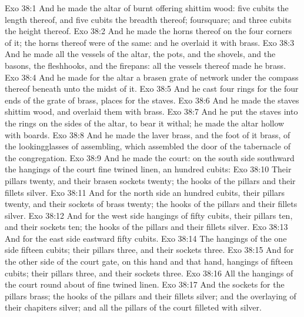 \vs Exo 38:1 And he made the altar of burnt offering  shittim wood: five cubits  the length thereof, and five cubits the breadth thereof;  foursquare; and three cubits the height thereof.
\vs Exo 38:2 And he made the horns thereof on the four corners of it; the horns thereof were of the same: and he overlaid it with brass.
\vs Exo 38:3 And he made all the vessels of the altar, the pots, and the shovels, and the basons,  the fleshhooks, and the firepans: all the vessels thereof made he  brass.
\vs Exo 38:4 And he made for the altar a brasen grate of network under the compass thereof beneath unto the midst of it.
\vs Exo 38:5 And he cast four rings for the four ends of the grate of brass,  places for the staves.
\vs Exo 38:6 And he made the staves  shittim wood, and overlaid them with brass.
\vs Exo 38:7 And he put the staves into the rings on the sides of the altar, to bear it withal; he made the altar hollow with boards.
\vs Exo 38:8 And he made the laver  brass, and the foot of it  brass, of the lookingglasses of  assembling, which assembled  the door of the tabernacle of the congregation.
\vs Exo 38:9 And he made the court: on the south side southward the hangings of the court  fine twined linen, an hundred cubits:
\vs Exo 38:10 Their pillars  twenty, and their brasen sockets twenty; the hooks of the pillars and their fillets  silver.
\vs Exo 38:11 And for the north side  an hundred cubits, their pillars  twenty, and their sockets of brass twenty; the hooks of the pillars and their fillets  silver.
\vs Exo 38:12 And for the west side  hangings of fifty cubits, their pillars ten, and their sockets ten; the hooks of the pillars and their fillets  silver.
\vs Exo 38:13 And for the east side eastward fifty cubits.
\vs Exo 38:14 The hangings of the one side  fifteen cubits; their pillars three, and their sockets three.
\vs Exo 38:15 And for the other side of the court gate, on this hand and that hand,  hangings of fifteen cubits; their pillars three, and their sockets three.
\vs Exo 38:16 All the hangings of the court round about  of fine twined linen.
\vs Exo 38:17 And the sockets for the pillars  brass; the hooks of the pillars and their fillets  silver; and the overlaying of their chapiters  silver; and all the pillars of the court  filleted with silver.
